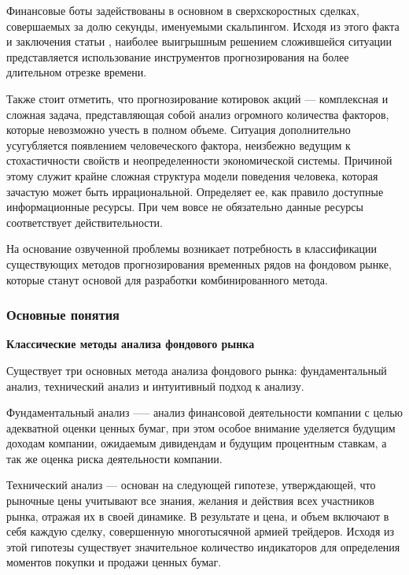  \par Финансовые боты задействованы в основном в сверхскоростных сделках, совершаемых за долю секунды, именуемыми скальпингом. Исходя из этого факта и заключения статьи \cite{scalping}, наиболее выигрышным решением сложившейся ситуации представляется использование инструментов прогнозирования на более длительном отрезке времени. 
 
 \par Также стоит отметить, что прогнозирование котировок акций –-- комплексная и сложная задача, представляющая собой анализ огромного количества факторов, которые невозможно учесть в полном объеме. Ситуация дополнительно усугубляется появлением человеческого фактора, неизбежно ведущим к стохастичности свойств и неопределенности экономической системы. Причиной этому служит крайне сложная структура модели поведения человека, которая зачастую может быть иррациональной. \cite{behavioral-patterns} Определяет ее, как правило доступные информационные ресурсы. \cite{news-impact} При чем вовсе не обязательно данные ресурсы соответствует действительности. \cite{news-fake}
 
 \par На основание озвученной проблемы возникает потребность в классификации существующих методов прогнозирования временных рядов на фондовом рынке, которые станут основой для разработки комбинированного метода. 
 
\subsubsection{Основные понятия}





\textbf{Классические методы анализа фондового рынка}

\par Существует три основных метода анализа фондового рынка: фундаментальный анализ, технический анализ и интуитивный подход к анализу.\cite{fund-anal}

\par Фундаментальный анализ —-- анализ финансовой
деятельности компании с целью адекватной оценки ценных бумаг,
при этом особое внимание уделяется будущим доходам компании,
ожидаемым дивидендам и будущим процентным ставкам, а так
же оценка риска деятельности компании.\cite{fund-anal}

\par Технический анализ --- основан на следующей гипотезе, утверждающей, что рыночные цены учитывают все знания, желания и действия всех участников рынка, отражая их в своей динамике. В результате и цена, и объем включают в себя каждую сделку, совершенную многотысячной армией трейдеров. Исходя из этой гипотезы существует значительное количество индикаторов для определения моментов покупки и продажи ценных бумаг. \cite{fund-anal}

